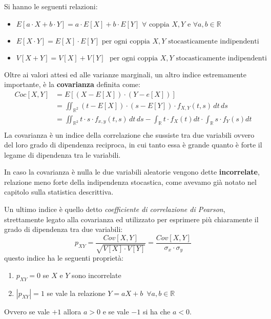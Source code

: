 \documentclass[a4paper,12pt, oneside]{book}
\newcommand{\numberset}{\mathbb}
\newcommand{\R}{\numberset{R}}
\begin{document}
Si hanno le seguenti relazioni:
\begin{itemize}
    \item $E[a\cdot X + b \cdot Y] = a\cdot E[X] + b\cdot E[Y]\,\,\forall \mbox{ coppia }X,Y \mbox{ e }
                                     \forall a,b \in \R$
    \item $E[X \cdot Y] = E[X]\cdot E[Y]\,\,\mbox{per ogni coppia }X,Y \mbox{ stocasticamente indipendenti}$
    \item $V[X + Y]= V[X] + V[Y]\,\, \mbox{ per ogni coppia }X,Y \mbox{ stocasticamente indipendenti}$
\end{itemize}
Oltre ai valori attesi ed alle varianze marginali, un altro indice estremamente importante, 
è la \textbf{covarianza} definita come:
\[ \begin{split}
    Coc[X, Y] & = E[(X-E[X])\cdot(Y-e[X])]\\ 
              & = \iint_{\R^2} (t - E[X])\cdot (s - E[Y])\cdot f_{X,Y}(t,s)\,dt\,ds\\
              & = \iint_{\R^2} t \cdot s\cdot f_{x,y}(t,s)\,dt\,ds 
                  - \int_{\R} t \cdot f_X(t) dt \cdot \int_{\R}s \cdot f_Y(s)dt \\
    \end{split} \]
La covarianza è un indice della correlazione che sussiste tra due variabili ovvero del loro grado di
dipendenza reciproca, in cui tanto essa è grande quanto è forte il legame di dipendenza tra le variabili.

In caso la covarianza è nulla le due variabili aleatorie vengono dette \textbf{incorrelate}, relazione 
meno forte della indipendenza stocastica, come avevamo già notato nel capitolo sulla statistica descrittiva.

Un ultimo indice è quello detto \emph{coefficiente di correlazione di Pearson}, strettamente legato 
alla covarianza ed utilizzato per esprimere più chiaramente il grado di dipendenza tra due variabili:
\[p_{XY} = \frac{Cov[X,Y]}{\sqrt{V[X]\cdot V[Y]}} = \frac{Cov[X,Y]}{\sigma_x\cdot \sigma_y}\]
questo indice ha le seguenti proprietà:
\begin{enumerate}
    \item $p_{XY}=0$ se $X$ e $Y$ sono incorrelate
    \item $|p_{XY}|=1$ se vale la relazione $Y= aX + b\,\,\,\forall a,b \in \R$
\end{enumerate}
Ovvero se vale $+1$ allora $a>0$ e se vale $-1$ si ha che $a<0$.
\end{document}
